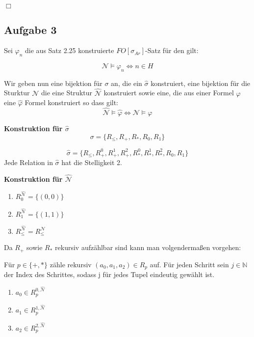 \documentclass[12pt]{article}
\begin{document}
\begin{flushright} $\Box$ \end{flushright}



\subsection*{Aufgabe 3}

Sei $\varphi_n$ die aus Satz 2.25 konstruierte $FO[\sigma_{Ar}]$-Satz für den gilt:

\[ \mathcal{N}\models\varphi_n \Leftrightarrow n\in H \]

Wir geben nun eine bijektion für $\sigma$ an, die ein $\hat\sigma$ konstruiert,
eine bijektion für die Sturktur $\mathcal{N}$ die eine Struktur
$\hat {\mathcal{N}}$ konstruiert sowie eine, die aus einer Formel $\varphi$
eine $\hat\varphi$ Formel konstruiert so dass gilt:
\begin{equation}
  \hat{\mathcal{N}}\models\hat\varphi \Leftrightarrow \mathcal{N}\models\varphi
\end{equation}

\textbf{Konstruktion für $\hat\sigma$}
\[ \sigma = \{R_{\leq}, R_{+}, R_{*}, R_{0}, R_{1}\} \]

\[ \hat\sigma = \{R_{\leq}, R_{+}^0, R_{+}^1, R_{+}^2, R_{*}^0, R_{*}^1, R_{*}^2, R_{0}, R_{1}\} \]
Jede Relation in $\hat\sigma$ hat die Stelligkeit 2.

\textbf{Konstruktion für $\hat{\mathcal{N}}$}

\begin{enumerate}
  \item $R_0^{\hat{\mathcal{N}}} = \{(0,0)\}$
  \item $R_1^{\hat{\mathcal{N}}} = \{(1,1)\}$
  \item $R_\leq^{\hat{\mathcal{N}}} = R_\leq^\mathcal{N}$
\end{enumerate}

Da $R_+$ sowie $R_*$ rekursiv aufzählbar sind kann man volgendermaßen vorgehen:

Für $p\in\{+,*\}$ zähle rekursiv $(a_0,a_1,a_2)\in R_p$ auf. Für jeden Schritt
sein $j\in\mathbb N$ der Index des Schrittes, sodass j für jedes Tupel eindeutig
gewählt ist.

\begin{enumerate}
  \item $a_0\in R_p^{0,\hat{\mathcal{N}}}$
  \item $a_1\in R_p^{1,\hat{\mathcal{N}}}$
  \item $a_2\in R_p^{2,\hat{\mathcal{N}}}$
\end{enumerate}
\end{document}
